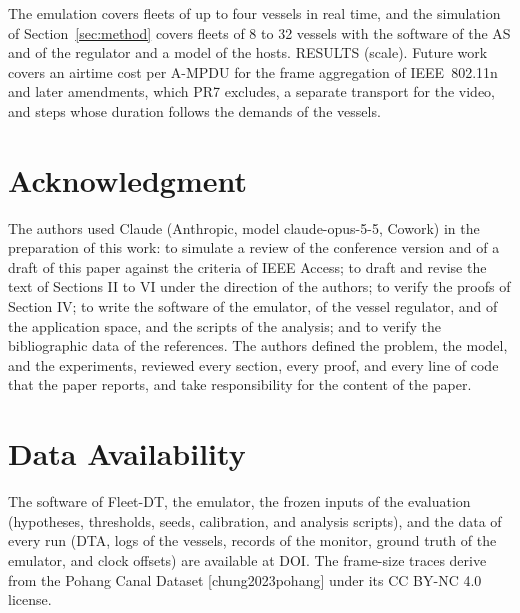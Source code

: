 The emulation covers fleets of up to four vessels in real time, and the simulation of Section~\ref{sec:method} covers fleets of 8 to 32 vessels with the software of the AS and of the regulator and a model of the hosts. RESULTS (scale). Future work covers an airtime cost per A-MPDU for the frame aggregation of IEEE~802.11n and later amendments, which PR7 excludes, a separate transport for the video, and steps whose duration follows the demands of the vessels.

\section*{Acknowledgment}
The authors used Claude (Anthropic, model claude-opus-5-5, Cowork) in the preparation of this work: to simulate a review of the conference version and of a draft of this paper against the criteria of IEEE Access; to draft and revise the text of Sections II to VI under the direction of the authors; to verify the proofs of Section IV; to write the software of the emulator, of the vessel regulator, and of the application space, and the scripts of the analysis; and to verify the bibliographic data of the references. The authors defined the problem, the model, and the experiments, reviewed every section, every proof, and every line of code that the paper reports, and take responsibility for the content of the paper.

\section*{Data Availability}
The software of Fleet-DT, the emulator, the frozen inputs of the evaluation (hypotheses, thresholds, seeds, calibration, and analysis scripts), and the data of every run (DTA, logs of the vessels, records of the monitor, ground truth of the emulator, and clock offsets) are available at DOI. The frame-size traces derive from the Pohang Canal Dataset [chung2023pohang] under its CC BY-NC 4.0 license.
